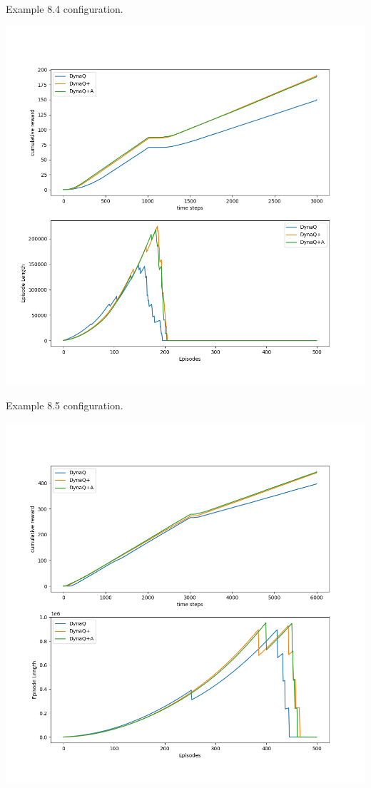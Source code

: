 \documentclass[11pt]{article}
\begin{document}
    Example 8.4 configuration.

    \includegraphics[scale=0.7]{example_8_4}

    Example 8.5 configuration.

    \includegraphics[scale=0.7]{example_8_4_2}
\end{document}

